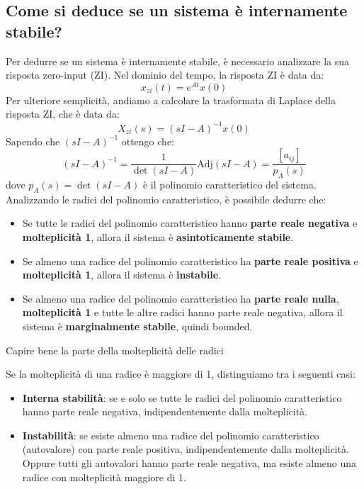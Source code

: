 \subsection{Come si deduce se un sistema è internamente stabile?}
Per dedurre se un sistema è internamente stabile, è necessario analizzare la
sua risposta zero-input (ZI). Nel dominio del tempo, la risposta ZI è data da:
\begin{equation}
    x_{zi}(t) = e^{At} x(0)
\end{equation}
Per ulteriore semplicità, andiamo a calcolare la trasformata di Laplace della
risposta ZI, che è data da:
\begin{equation}
    X_{zi}(s) = (sI - A)^{-1} x(0)
\end{equation}
Sapendo che $(sI-A)^{-1}$ ottengo che:
\begin{equation}
    (sI - A)^{-1} = \frac{1}{\det(sI - A)} \text{Adj}(sI - A) = \frac{[a_{ij}]}{p_A(s)}
\end{equation}
dove $p_A(s) = \det(sI - A)$ è il polinomio caratteristico del sistema.
\newpage
Analizzando le radici del polinomio caratteristico, è possibile dedurre che:
\begin{itemize}
    \item Se tutte le radici del polinomio caratteristico hanno \textbf{parte reale
              negativa} e \textbf{molteplicità 1}, allora il sistema è
          \textbf{asintoticamente stabile}.
    \item Se almeno una radice del polinomio caratteristico ha \textbf{parte reale
              positiva} e \textbf{molteplicità 1}, allora il sistema è \textbf{instabile}.
    \item Se almeno una radice del polinomio caratteristico ha \textbf{parte reale
              nulla}, \textbf{molteplicità 1} e tutte le altre radici hanno parte reale
          negativa, allora il sistema è \textbf{marginalmente stabile}, quindi bounded.
\end{itemize}
Capire bene la parte della molteplicità delle radici

Se la molteplicità di una radice è maggiore di 1, distinguiamo tra i seguenti
casi:
\begin{itemize}
    \item \textbf{Interna stabilità}: se e solo se tutte le radici del polinomio
          caratteristico hanno parte reale negativa, indipendentemente dalla
          molteplicità.
    \item \textbf{Instabilità}: se esiste almeno una radice del polinomio
          caratteristico (autovalore) con parte reale positiva,
          indipendentemente dalla molteplicità. Oppure tutti gli autovalori
          hanno parte reale negativa, ma esiste almeno una radice con
          molteplicità maggiore di 1.
\end{itemize}
